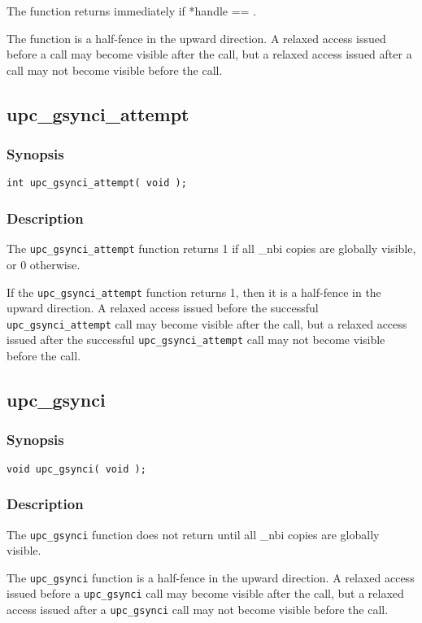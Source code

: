 \np The \function{} function returns immediately if *handle ==
\complete{}.

\np The \function{} function is a half-fence in the upward direction.
A relaxed access issued before a \function{} call may become visible after the
call, but a relaxed access issued after a \function{} call may not become
visible before the call.

\newpage
\subsection{upc\_gsynci\_attempt}
\def\function{{\tt upc\_gsynci\_attempt}}

\subsubsection{Synopsis}

\begin{verbatim}
int upc_gsynci_attempt( void );
\end{verbatim}

\subsubsection{Description}

\npf The \function{} function returns 1 if all \_nbi copies are
globally visible, or 0 otherwise.

\np If the \function{} function returns 1, then it is a half-fence in the
upward direction.  A relaxed access issued before the successful \function{} call
may become visible after the call, but a relaxed access issued after the
successful \function{} call may not become visible before the call.

\subsection{upc\_gsynci}
\def\function{{\tt upc\_gsynci}}

\subsubsection{Synopsis}

\begin{verbatim}
void upc_gsynci( void );
\end{verbatim}

\subsubsection{Description}

\npf The \function{} function does not return until all \_nbi copies
are globally visible.

\np The \function{} function is a half-fence in the upward direction.  A
relaxed access issued before a \function{} call may become visible after the call,
but a relaxed access issued after a \function{} call may not become visible before
the call.
